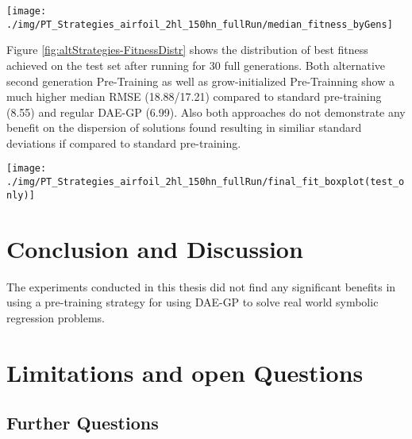 \documentclass[
  11pt,
]{article}
\let\origfigure\figure
\let\endorigfigure\endfigure
\renewenvironment{figure}[1][2] {
    \expandafter\origfigure\expandafter[H]
} {
    \endorigfigure
}
\begin{document}
\begin{figure}[c]

{\centering \texttt{[image: ./img/PT\_Strategies\_airfoil\_2hl\_150hn\_fullRun/median\_fitness\_byGens]} 

}

\caption{Best Fitness over 30 Generations - Alternative Pre-Trategies - Airfoil}\label{fig:altStrategies-Fitness}
\end{figure}

Figure \ref{fig:altStrategies-FitnessDistr} shows the distribution of best fitness achieved on the test set after running for 30 full generations. Both alternative second generation Pre-Training as well as grow-initialized Pre-Trainning show a much higher median RMSE (18.88/17.21) compared to standard pre-training (8.55) and regular DAE-GP (6.99). Also both approaches do not demonstrate any benefit on the dispersion of solutions found resulting in similiar standard deviations if compared to standard pre-training.

\begin{figure}[c]

{\centering \texttt{[image: ./img/PT\_Strategies\_airfoil\_2hl\_150hn\_fullRun/final\_fit\_boxplot(test\_only)]} 

}

\caption{Best Fitness after 30 Generations - Alternative Pre-Trategies - Airfoil}\label{fig:altStrategies-FitnessDistr}
\end{figure}

\hypertarget{conclusion-and-discussion}{%
\section{Conclusion and Discussion}\label{conclusion-and-discussion}}

The experiments conducted in this thesis did not find any significant benefits in using a pre-training strategy for using DAE-GP to solve real world symbolic regression problems.

\hypertarget{limitations-and-open-questions}{%
\section{Limitations and open Questions}\label{limitations-and-open-questions}}

\hypertarget{further-questions}{%
\subsection{Further Questions}\label{further-questions}}
\end{document}
